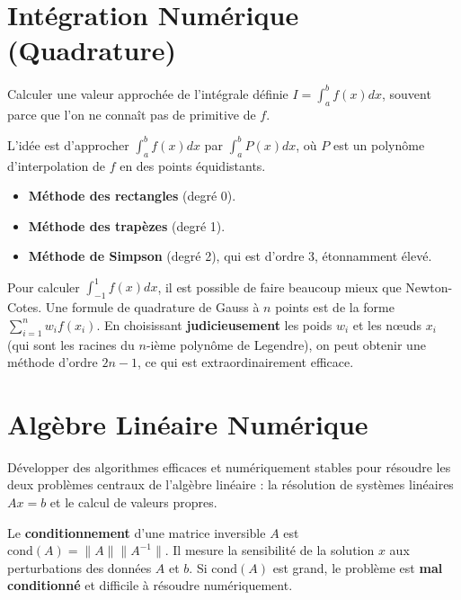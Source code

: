 \section{Intégration Numérique (Quadrature)}

\begin{objectif}
    Calculer une valeur approchée de l'intégrale définie $I = \int_a^b f(x) dx$, souvent parce que l'on ne connaît pas de primitive de $f$.
\end{objectif}

\begin{definition}
    L'idée est d'approcher $\int_a^b f(x) dx$ par $\int_a^b P(x) dx$, où $P$ est un polynôme d'interpolation de $f$ en des points équidistants.
    \begin{itemize}
        \item \textbf{Méthode des rectangles} (degré 0).
        \item \textbf{Méthode des trapèzes} (degré 1).
        \item \textbf{Méthode de Simpson} (degré 2), qui est d'ordre 3, étonnamment élevé.
    \end{itemize}
\end{definition}

\begin{theorem}
    Pour calculer $\int_{-1}^1 f(x) dx$, il est possible de faire beaucoup mieux que Newton-Cotes. Une formule de quadrature de Gauss à $n$ points est de la forme $\sum_{i=1}^n w_i f(x_i)$. En choisissant \textbf{judicieusement} les poids $w_i$ et les nœuds $x_i$ (qui sont les racines du $n$-ième polynôme de Legendre), on peut obtenir une méthode d'ordre $2n-1$, ce qui est extraordinairement efficace.
\end{theorem}

\section{Algèbre Linéaire Numérique}

\begin{objectif}
    Développer des algorithmes efficaces et numériquement stables pour résoudre les deux problèmes centraux de l'algèbre linéaire : la résolution de systèmes linéaires $Ax=b$ et le calcul de valeurs propres.
\end{objectif}

\begin{definition}[Conditionnement]
    Le \textbf{conditionnement} d'une matrice inversible $A$ est $\mathrm{cond}(A) = \|A\| \|A^{-1}\|$. Il mesure la sensibilité de la solution $x$ aux perturbations des données $A$ et $b$. Si $\mathrm{cond}(A)$ est grand, le problème est \textbf{mal conditionné} et difficile à résoudre numériquement.
\end{definition}

